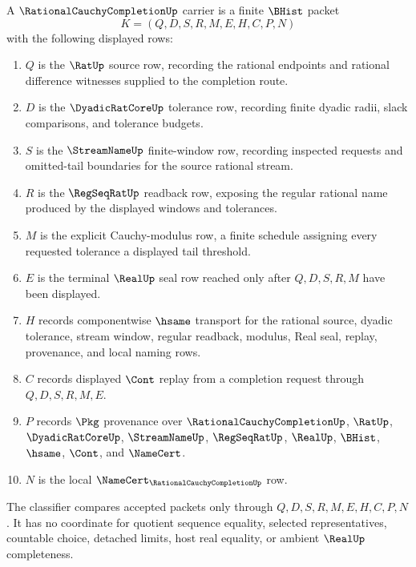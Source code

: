 \begin{definition}
\label{def:rational-cauchy-completion-carrier}
A $\RationalCauchyCompletionUp$ carrier is a finite $\BHist$ packet
$$
K=(Q,D,S,R,M,E,H,C,P,N)
$$
with the following displayed rows:
\begin{enumerate}
\item $Q$ is the $\RatUp$ source row, recording the rational endpoints and rational difference witnesses supplied to the completion route.
\item $D$ is the $\DyadicRatCoreUp$ tolerance row, recording finite dyadic radii, slack comparisons, and tolerance budgets.
\item $S$ is the $\StreamNameUp$ finite-window row, recording inspected requests and omitted-tail boundaries for the source rational stream.
\item $R$ is the $\RegSeqRatUp$ readback row, exposing the regular rational name produced by the displayed windows and tolerances.
\item $M$ is the explicit Cauchy-modulus row, a finite schedule assigning every requested tolerance a displayed tail threshold.
\item $E$ is the terminal $\RealUp$ seal row reached only after $Q,D,S,R,M$ have been displayed.
\item $H$ records componentwise $\hsame$ transport for the rational source, dyadic tolerance, stream window, regular readback, modulus, Real seal, replay, provenance, and local naming rows.
\item $C$ records displayed $\Cont$ replay from a completion request through $Q,D,S,R,M,E$.
\item $P$ records $\Pkg$ provenance over $\RationalCauchyCompletionUp$, $\RatUp$, $\DyadicRatCoreUp$, $\StreamNameUp$, $\RegSeqRatUp$, $\RealUp$, $\BHist$, $\hsame$, $\Cont$, and $\NameCert$.
\item $N$ is the local $\NameCert_{\RationalCauchyCompletionUp}$ row.
\end{enumerate}
The classifier compares accepted packets only through $Q,D,S,R,M,E,H,C,P,N$. It has no coordinate for quotient sequence equality, selected representatives, countable choice, detached limits, host real equality, or ambient $\RealUp$ completeness.
\end{definition}

